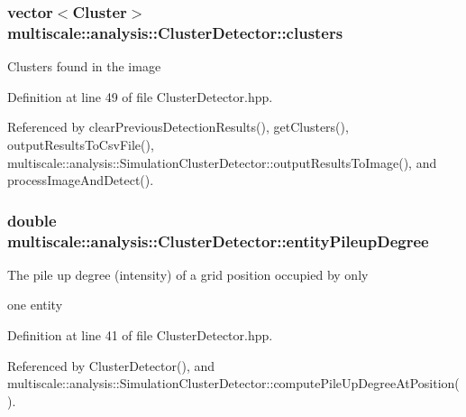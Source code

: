 \hypertarget{classmultiscale_1_1analysis_1_1ClusterDetector_aa81a8649bc743389c2fc1919d47eb5b3}{
\subsubsection[{clusters}]{\setlength{\rightskip}{0pt plus 5cm}vector$<${\bf Cluster}$>$ multiscale\-::analysis\-::\-Cluster\-Detector\-::clusters\hspace{0.3cm}{\ttfamily [protected]}}}\label{classmultiscale_1_1analysis_1_1ClusterDetector_aa81a8649bc743389c2fc1919d47eb5b3}
Clusters found in the image 

Definition at line 49 of file Cluster\-Detector.\-hpp.



Referenced by clear\-Previous\-Detection\-Results(), get\-Clusters(), output\-Results\-To\-Csv\-File(), multiscale\-::analysis\-::\-Simulation\-Cluster\-Detector\-::output\-Results\-To\-Image(), and process\-Image\-And\-Detect().

\hypertarget{classmultiscale_1_1analysis_1_1ClusterDetector_aaa93a4b3a5a3c4279aa434669093ac40}{
\subsubsection[{entity\-Pileup\-Degree}]{\setlength{\rightskip}{0pt plus 5cm}double multiscale\-::analysis\-::\-Cluster\-Detector\-::entity\-Pileup\-Degree\hspace{0.3cm}{\ttfamily [protected]}}}\label{classmultiscale_1_1analysis_1_1ClusterDetector_aaa93a4b3a5a3c4279aa434669093ac40}
\begin{DoxyVerb}      The pile up degree (intensity) of a grid position occupied by only
\end{DoxyVerb}
 one entity 

Definition at line 41 of file Cluster\-Detector.\-hpp.



Referenced by Cluster\-Detector(), and multiscale\-::analysis\-::\-Simulation\-Cluster\-Detector\-::compute\-Pile\-Up\-Degree\-At\-Position().


